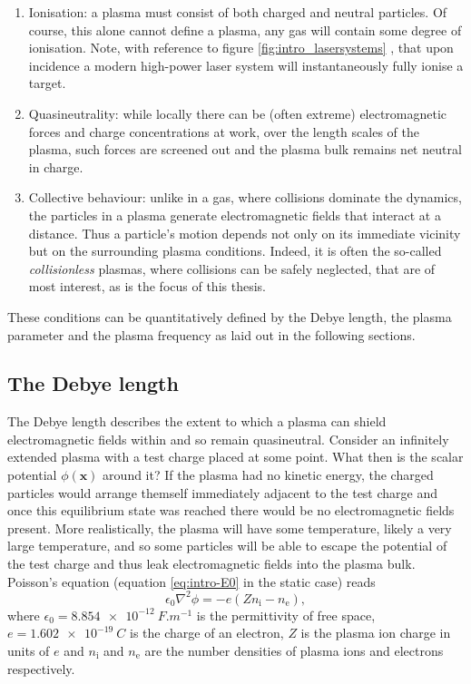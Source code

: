 \begin{enumerate}
	\item Ionisation: a plasma must consist of both charged and neutral particles. Of course, this alone cannot define a plasma, any gas will contain some degree of ionisation. Note, with reference to figure \ref{fig:intro_lasersystems} \cite{umstadterRelativisticLaserPlasma2003}, that upon incidence a modern high-power laser system will instantaneously fully ionise a target.
	\item Quasineutrality: while locally there can be (often extreme) electromagnetic forces and charge concentrations at work, over the length scales of the plasma, such forces are screened out and the plasma bulk remains net neutral in charge.
	\item Collective behaviour: unlike in a gas, where collisions dominate the dynamics, the particles in a plasma generate electromagnetic fields that interact at a distance. Thus a particle's motion depends not only on its immediate vicinity but on the surrounding plasma conditions. Indeed, it is often the so-called \textit{collisionless} plasmas, where collisions can be safely neglected, that are of most interest, as is the focus of this thesis.
\end{enumerate}

These conditions can be quantitatively defined by the Debye length, the plasma parameter and the plasma frequency as laid out in the following sections.

\subsection{\label{sec:debye_length}The Debye length}
The Debye length describes the extent to which a plasma can shield electromagnetic fields within and so remain quasineutral. Consider an infinitely extended plasma with a test charge placed at some point. What then is the scalar potential $\phi(\mathbf{x})$ around it? If the plasma had no kinetic energy, the charged particles would arrange themself immediately adjacent to the test charge and once this equilibrium state was reached there would be no electromagnetic fields present. More realistically, the plasma will have some temperature, likely a very large temperature, and so some particles will be able to escape the potential of the test charge and thus leak electromagnetic fields into the plasma bulk. Poisson's equation (equation \ref{eq:intro-E0} in the static case) reads
\begin{equation}\label{eq:poisson}
	\epsilon_0\nabla^2\phi = -e(Zn_\mathrm{i} - n_\mathrm{e}),
\end{equation}
where $\epsilon_0 = \qty{8.854e-12}{F.m^{-1}}$ is the permittivity of free space, $e = \qty{1.602e-19}{C}$ is the charge of an electron, $Z$ is the plasma ion charge in units of $e$ and $n_\mathrm{i}$ and $n_\mathrm{e}$ are the number densities of plasma ions and electrons respectively.

